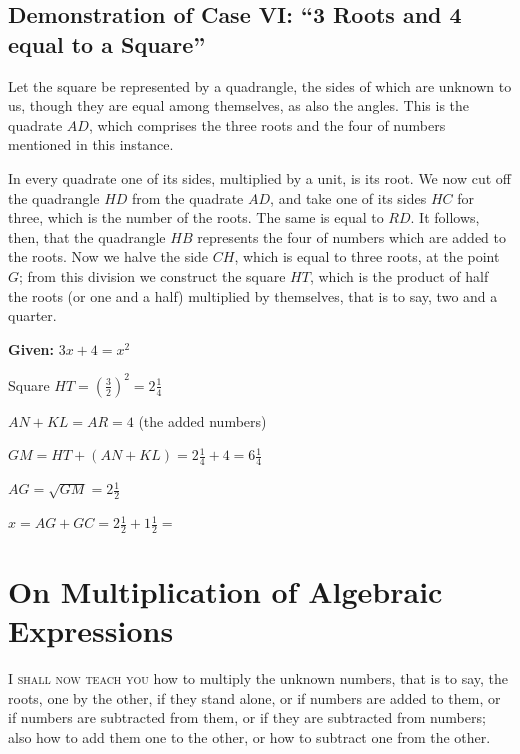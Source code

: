 \documentclass[11pt,a4paper]{book}
\begin{document}
\section{Demonstration of Case VI: ``3 Roots and 4 equal to a Square''}

Let the square be represented by a quadrangle, the sides of which are unknown
to us, though they are equal among themselves, as also the angles. This is the
quadrate $AD$, which comprises the three roots and the four of numbers
mentioned in this instance.

In every quadrate one of its sides, multiplied by a unit, is its root. We now
cut off the quadrangle $HD$ from the quadrate $AD$, and take one of its sides
$HC$ for three, which is the number of the roots. The same is equal to $RD$.
It follows, then, that the quadrangle $HB$ represents the four of numbers
which are added to the roots. Now we halve the side $CH$, which is equal to
three roots, at the point $G$; from this division we construct the square
$HT$, which is the product of half the roots (or one and a half) multiplied
by themselves, that is to say, two and a quarter.

\begin{mathbox}[title={\textbf{Geometric Proof of Case VI}}]
\begin{center}
\textbf{Given:} $3x + 4 = x^2$

\vspace{0.3cm}

Square $HT = \left(\frac{3}{2}\right)^2 = 2\tfrac{1}{4}$

$AN + KL = AR = 4$ (the added numbers)

$GM = HT + (AN + KL) = 2\tfrac{1}{4} + 4 = 6\tfrac{1}{4}$

$AG = \sqrt{GM} = 2\tfrac{1}{2}$

$x = AG + GC = 2\tfrac{1}{2} + 1\tfrac{1}{2} =$ 
\end{center}
\end{mathbox}

\newpage

\chapter{On Multiplication of Algebraic Expressions}
\label{ch:multiplication}

\lettrine[lines=3, lhang=0.33, nindent=0em, findent=3pt]{
\textcolor{dropgold}{I}}{ shall now teach you} how to multiply the unknown numbers, that is to
say, the roots, one by the other, if they stand alone, or if numbers are
added to them, or if numbers are subtracted from them, or if they are
subtracted from numbers; also how to add them one to the other, or how to
subtract one from the other.
\end{document}
